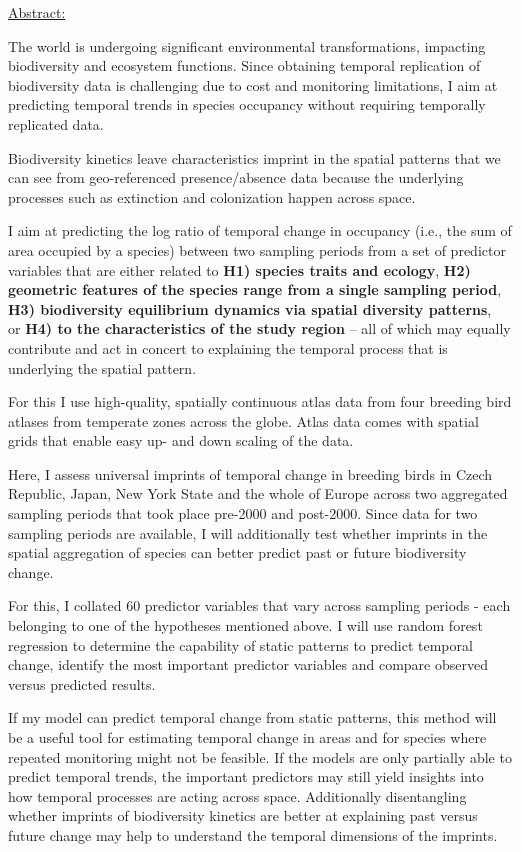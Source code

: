 \documentclass[
  letterpaper,
  DIV=11,
  numbers=noendperiod]{scrreprt}
\begin{document}
\ul{Abstract:}

The world is undergoing significant environmental transformations,
impacting biodiversity and ecosystem functions. Since obtaining temporal
replication of biodiversity data is challenging due to cost and
monitoring limitations, I aim at predicting temporal trends in species
occupancy without requiring temporally replicated data.

Biodiversity kinetics leave characteristics imprint in the spatial
patterns that we can see from geo-referenced presence/absence data
because the underlying processes such as extinction and colonization
happen across space.

I aim at predicting the log ratio of temporal change in occupancy (i.e.,
the sum of area occupied by a species) between two sampling periods from
a set of predictor variables that are either related to \textbf{H1)
species traits and ecology}, \textbf{H2)~ geometric features of the
species range from a single sampling period}, \textbf{H3) biodiversity
equilibrium dynamics via spatial diversity patterns},~ or \textbf{H4) to
the characteristics of the study region} -- all of which may equally
contribute and act in concert to explaining the temporal process that is
underlying the spatial pattern.

For this I use high-quality, spatially continuous atlas data from four
breeding bird atlases from temperate zones across the globe. Atlas data
comes with spatial grids that enable easy up- and down scaling of the
data.

Here, I assess universal imprints of temporal change in breeding birds
in Czech Republic, Japan, New York State and the whole of Europe across
two aggregated sampling periods that took place pre-2000 and post-2000.
Since data for two sampling periods are available, I will additionally
test whether imprints in the spatial aggregation of species can better
predict past or future biodiversity change.

For this, I collated 60 predictor variables that vary across sampling
periods - each belonging to one of the hypotheses mentioned above. I
will use random forest regression to determine the capability of static
patterns to predict temporal change, identify the most important
predictor variables and compare observed versus predicted results.

If my model can predict temporal change from static patterns, this
method will be a useful tool for estimating temporal change in areas and
for species where repeated monitoring might not be feasible. If the
models are only partially able to predict temporal trends, the important
predictors may still yield insights into how temporal processes are
acting across space. Additionally disentangling whether imprints of
biodiversity kinetics are better at explaining past versus future change
may help to understand the temporal dimensions of the imprints.
\end{document}

